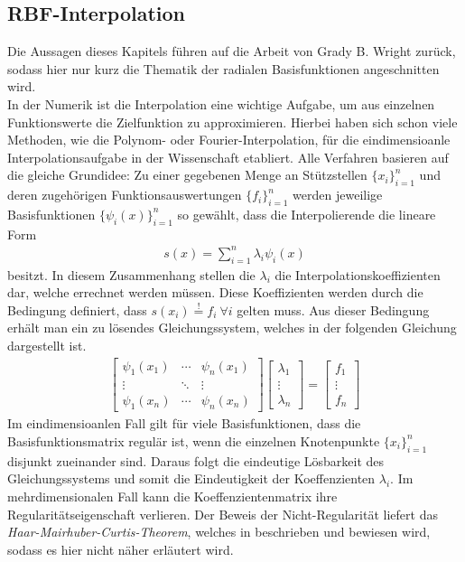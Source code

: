 \documentclass[a4paper,11pt]{article}
\begin{document}
\subsection{RBF-Interpolation}
Die Aussagen dieses Kapitels führen auf die Arbeit von Grady B. Wright \cite{wright2003radial} zurück, sodass  hier nur kurz die Thematik der radialen Basisfunktionen angeschnitten wird.\\
In der Numerik ist die Interpolation eine wichtige Aufgabe, um aus einzelnen Funktionswerte die Zielfunktion zu approximieren. Hierbei haben sich schon viele Methoden, wie die Polynom- oder Fourier-Interpolation, für die eindimensioanle Interpolationsaufgabe in der Wissenschaft etabliert. Alle Verfahren basieren auf die gleiche Grundidee: Zu einer gegebenen Menge an Stützstellen $\{x_i\}_{i=1}^n$ und deren zugehörigen Funktionsauswertungen $\{f_i\}_{i=1}^n$ werden jeweilige Basisfunktionen $\{\psi_i(x)\}_{i=1}^n$ so gewählt, dass die Interpolierende die lineare Form
\begin{align}
 s(x)=\sum_{i=1}^n\lambda_i\psi_i(x)
\end{align}
besitzt. In diesem Zusammenhang stellen die $\lambda_i$ die Interpolationskoeffizienten dar, welche errechnet werden müssen. Diese Koeffizienten werden durch die Bedingung definiert, dass $s(x_i)\overset{!}{=}f_i~\forall i$ gelten muss. Aus dieser Bedingung erhält man ein zu lösendes Gleichungssystem, welches in der folgenden Gleichung dargestellt ist.
\begin{align}
\begin{bmatrix}
 \psi_1(x_1) & \cdots & \psi_n(x_1) \\ \vdots & \ddots & \vdots \\ \psi_1(x_n) & \cdots & \psi_n(x_n)
\end{bmatrix}
\begin{bmatrix}
 \lambda_1 \\ \vdots \\ \lambda_n
\end{bmatrix}
=
\begin{bmatrix}
 f_1 \\ \vdots \\ f_n
\end{bmatrix}\label{eq:Intermatrix}
\end{align}
Im eindimensioanlen Fall gilt für viele Basisfunktionen, dass die Basisfunktionsmatrix regulär ist, wenn die einzelnen Knotenpunkte $\{x_i\}_{i=1}^n$ disjunkt zueinander sind. Daraus folgt die eindeutige Lösbarkeit des Gleichungssystems und somit die Eindeutigkeit der Koeffenzienten $\lambda_i$. Im mehrdimensionalen Fall kann die Koeffenzientenmatrix ihre Regularitätseigenschaft verlieren. Der Beweis der Nicht-Regularität liefert das \textit{Haar-Mairhuber-Curtis-Theorem}, welches in \cite{de2013four} beschrieben und bewiesen wird, sodass es hier nicht näher erläutert wird.\\
\end{document}

